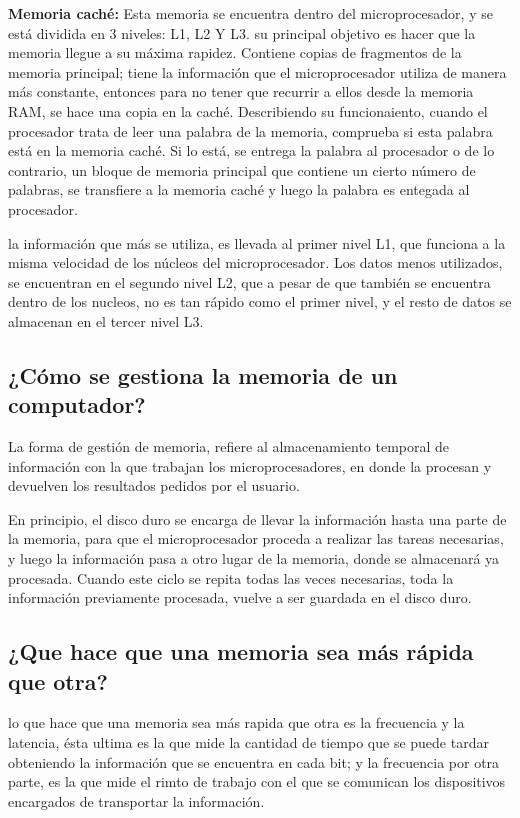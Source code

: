 \documentclass{article}
\begin{document}
\textbf{Memoria caché:} Esta memoria se encuentra dentro del microprocesador, y se está dividida en 3 niveles: L1, L2 Y L3. su principal objetivo es hacer que la memoria llegue a su máxima rapidez. Contiene copias de fragmentos de la memoria principal; tiene la información que el microprocesador utiliza de manera más constante, entonces para no tener que recurrir a ellos desde la memoria RAM, se hace una copia en la caché.  
Describiendo su funcionaiento, cuando el procesador trata de leer una palabra de la memoria, comprueba si esta palabra está en la memoria caché. Si lo está, se entrega la palabra al procesador o de lo contrario, un bloque de memoria principal que contiene un cierto número de palabras, se transfiere a la memoria caché y luego la palabra es entegada al procesador.  

la información que más se utiliza, es llevada al primer nivel L1, que funciona a la misma velocidad de los núcleos del microprocesador. Los datos menos utilizados, se encuentran en el segundo nivel L2, que a pesar de que también se encuentra dentro de los nucleos, no es tan rápido como el primer nivel, y el resto de datos se almacenan en el tercer nivel L3. 
 
\subsection{¿Cómo se gestiona la memoria de un computador?}
%
La forma de gestión de memoria, refiere al almacenamiento temporal de información con la que trabajan los microprocesadores, en donde la procesan y devuelven los resultados pedidos por el usuario.

En principio, el disco duro se encarga de llevar la información hasta una parte de la memoria, para que el microprocesador proceda a realizar las tareas necesarias, y luego la información pasa a otro lugar de la memoria, donde se almacenará ya procesada.
Cuando este ciclo se repita todas las veces necesarias, toda la información previamente procesada, vuelve a ser guardada en el disco duro.

\subsection{¿Que hace que una memoria sea más rápida que otra?}
%
lo que hace que una memoria sea más rapida que otra es la frecuencia y la latencia, ésta ultima es la que mide la cantidad de tiempo que se puede tardar obteniendo la información que se encuentra en cada bit; y la frecuencia por otra parte, es la que mide el rimto de trabajo con el que se comunican los dispositivos encargados de transportar la información.
\end{document}
